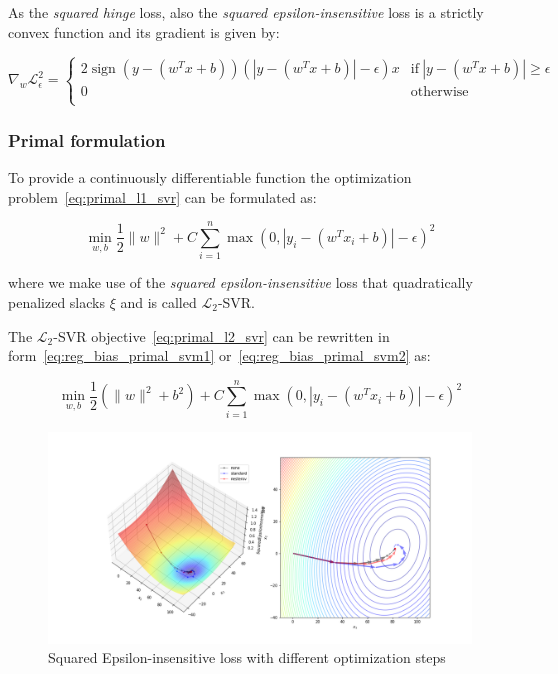 As the \emph{squared hinge} loss, also the \emph{squared epsilon-insensitive} loss is a strictly convex function and its gradient is given by:


\begin{equation} \label{eq:squared_eps_loss_der}
	\nabla_w \mathcal{L}_\epsilon^2=
		\begin{cases}
            \displaystyle 2 \operatorname{sign}(y - (w^T x + b)) (|y - (w^T x + b)| - \epsilon) x & \text{if} \ |y - (w^T x + b)| \geq \epsilon \\
            0 & \text{otherwise} \\ 
        \end{cases}
\end{equation}

\subsubsection{Primal formulation}

To provide a continuously differentiable function the optimization problem~\eqref{eq:primal_l1_svr} can be formulated as:

\begin{equation} \label{eq:primal_l2_svr}
    \min_{w,b} \frac{1}{2} \| w \|^2 + C \sum_{i=1}^n \max(0, |y_i - (w^T x_i + b)| - \epsilon)^2
\end{equation}

where we make use of the \emph{squared epsilon-insensitive} loss that quadratically penalized slacks $\xi$ and is called $\mathcal{L}_2$-SVR.

The $\mathcal{L}_2$-SVR objective~\eqref{eq:primal_l2_svr} can be rewritten in form~\eqref{eq:reg_bias_primal_svm1} or~\eqref{eq:reg_bias_primal_svm2} as:

\begin{equation} \label{eq:reg_bias_primal_l2_svr}
	\min_{w,b} \frac{1}{2} (\| w \|^2 + b^2) + C \sum_{i=1}^n \max(0, |y_i - (w^T x_i + b)| - \epsilon)^2
\end{equation}

\begin{figure}[h!]
	\centering
  	\includegraphics[scale=0.4]{img/l2_svr_loss}
  	\caption{Squared Epsilon-insensitive loss with different optimization steps}
  	\label{fig:l2_svr_loss}
\end{figure}


